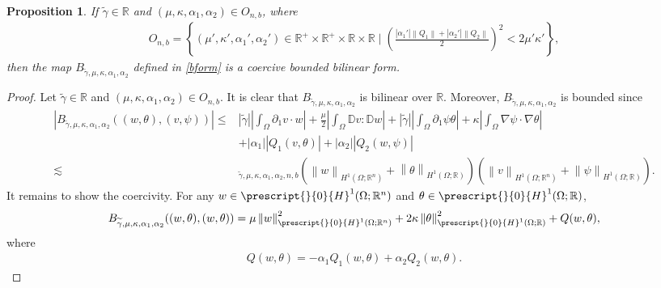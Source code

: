 \documentclass[11pt,letterpaper,reqno]{amsart}
\newtheorem{proposition}[theorem]{Proposition}
\numberwithin{equation}{section}
\newcommand{\abs}[1]{\left\lvert#1\right\rvert}
\newcommand{\norm}[1]{\left\lVert#1\right\rVert}
\begin{document}
\begin{proposition} \label{paramsp}
    If \(\widetilde{\gamma} \in \mathbb{R}\) and \((\mu,\kappa,\alpha_{1},\alpha_{2}) \in O_{n,b}\), where
    \begin{align}
        O_{n,b} = \left\{(\mu',\kappa',\alpha_{1}',\alpha_{2}') \in \mathbb{R}^{+} \times \mathbb{R}^{+} \times \mathbb{R} \times \mathbb{R} \mid \left(\frac{\abs{\alpha_{1}'}\norm{Q_{1}}+\abs{\alpha_{2}'}\norm{Q_{2}}}{2}\right)^{2} < 2\mu'\kappa'\right\},
    \end{align}
    then the map \(B_{\widetilde{\gamma},\mu,\kappa,\alpha_{1},\alpha_{2}}\) defined in \eqref{bform} is a coercive bounded bilinear form.
\end{proposition}
\begin{proof}
    Let \(\widetilde{\gamma} \in \mathbb{R}\) and \((\mu,\kappa,\alpha_{1},\alpha_{2}) \in O_{n,b}\). It is clear that \(B_{\widetilde{\gamma},\mu,\kappa,\alpha_{1},\alpha_{2}}\) is bilinear over \(\mathbb{R}\). Moreover, \(B_{\widetilde{\gamma},\mu,\kappa,\alpha_{1},\alpha_{2}}\) is bounded since
    \begin{align}
        \abs{B_{\widetilde{\gamma},\mu,\kappa,\alpha_{1},\alpha_{2}}((w,\theta),(v,\psi))} \leq& \abs{\widetilde{\gamma}}\abs{\int_{\Omega}\partial_{1}v \cdot w}+\frac{\mu}{2}\abs{\int_{\Omega}\mathbb{D}v:\mathbb{D}w}+\abs{\widetilde{\gamma}}\abs{\int_{\Omega}\partial_{1}\psi\theta}+\kappa\abs{\int_{\Omega}\nabla\psi \cdot \nabla\theta} \nonumber\\
        &+\abs{\alpha_{1}}\abs{Q_{1}(v,\theta)}+\abs{\alpha_{2}}\abs{Q_{2}(w,\psi)} \nonumber\\
        \lesssim&_{\widetilde{\gamma},\mu,\kappa,\alpha_{1},\alpha_{2},n,b}(\norm{w}_{H^{1}(\Omega;\mathbb{R}^{n})}+\norm{\theta}_{H^{1}(\Omega;\mathbb{R})})(\norm{v}_{H^{1}(\Omega;\mathbb{R}^{n})}+\norm{\psi}_{H^{1}(\Omega;\mathbb{R})}).
\end{align}
It remains to show the coercivity. For any \(w \in \prescript{}{0}{H}^{1}(\Omega;\mathbb{R}^{n})\) and \(\theta \in \prescript{}{0}{H}^{1}(\Omega;\mathbb{R})\),
\begin{align}
    B_{\widetilde{\gamma},\mu,\kappa,\alpha_{1},\alpha_{2}}((w,\theta),(w,\theta))=\mu\norm{w}_{\prescript{}{0}{H}^{1}(\Omega;\mathbb{R}^{n})}^{2}+2\kappa\norm{\theta}_{\prescript{}{0}{H}^{1}(\Omega;\mathbb{R})}^{2}+Q(w,\theta),
\end{align}
where
\begin{align} \label{q}
    Q(w,\theta)=-\alpha_{1}Q_{1}(w,\theta)+\alpha_{2}Q_{2}(w,\theta).

\end{align}
\end{proof}
\end{document}
